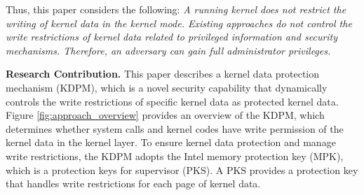 Thus, this paper considers the following:
{\it A running kernel does not restrict the writing of kernel data
in the kernel mode. 
%
Existing approaches do not control the write restrictions of kernel data related to
privileged information and security mechanisms. Therefore, an adversary can 
gain full administrator privileges.}
%


{\bf Research Contribution.}
This paper describes a kernel data protection mechanism (KDPM), which is
a novel security capability that dynamically controls the write restrictions of
specific kernel data as protected kernel data. 
Figure \ref{fig:approach_overview} provides an overview of the KDPM,
%
which determines whether system calls and kernel codes have write permission of
the kernel data in the kernel layer.
%
To ensure kernel data protection and manage write restrictions, the KDPM
adopts the Intel memory protection key (MPK), which is a protection keys for
supervisor (PKS).
%
A PKS provides a protection key that handles write restrictions for each page of
kernel data.

